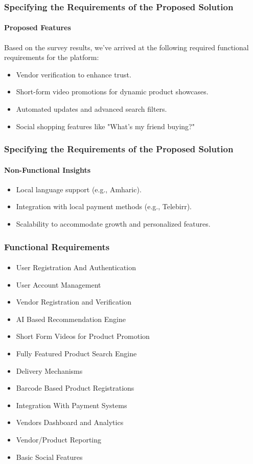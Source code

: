\documentclass{beamer}
\begin{document}
\begin{frame}
	\frametitle{Specifying the Requirements of the Proposed Solution}
	\framesubtitle{Proposed Features}
	Based on the survey results, we've arrived at the following required
	functional requirements for the platform:
	\begin{itemize}
		\item Vendor verification to enhance trust.
		\item Short-form video promotions for dynamic product showcases.
		\item Automated updates and advanced search filters.
		\item Social shopping features like "What’s my friend buying?"
	\end{itemize}
\end{frame}

\begin{frame}
	\frametitle{Specifying the Requirements of the Proposed Solution}
	\framesubtitle{Non-Functional Insights}
	\begin{itemize}
		\item Local language support (e.g., Amharic).
		\item Integration with local payment methods (e.g., Telebirr).
		\item Scalability to accommodate growth and personalized features.
	\end{itemize}
\end{frame}

\begin{frame}
	\frametitle{Functional Requirements}
	\framesubtitle{}
	\begin{itemize}
		\item User Registration And Authentication
		\item User Account Management
		\item Vendor Registration and Verification
		\item AI Based Recommendation Engine
		\item Short Form Videos for Product Promotion
		\item Fully Featured Product Search Engine
		\item Delivery Mechanisms
		\item Barcode Based Product Registrations
		\item Integration With Payment Systems
		\item Vendors Dashboard and Analytics
		\item Vendor/Product Reporting
		\item Basic Social Features
	\end{itemize}
\end{frame}
\end{document}
